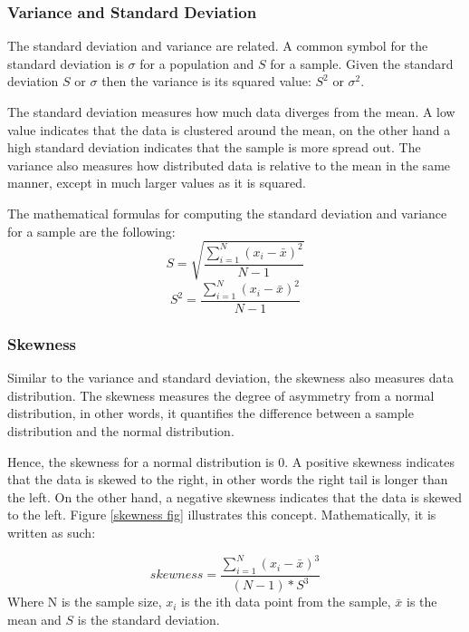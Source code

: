 \subsubsection{Variance and Standard Deviation}

The standard deviation and variance are related. A common symbol for the standard deviation is $\sigma$ for a population and $S$ for a sample. Given the standard deviation $S$ or $\sigma$ then the variance is its squared value: $S^{2}$ or $\sigma^{2}$.

The standard deviation measures how much data diverges from the mean. A low value indicates that the data is clustered around the mean, on the other hand a high standard deviation indicates that the sample is more spread out. The variance also measures how distributed data is relative to the mean in the same manner, except in much larger values as it is squared.

The mathematical formulas for computing the standard deviation and variance for a sample are the following:
\begin{equation}
    S = \sqrt{\frac{\sum_{i=1}^{N}(x_{i} - \bar{x})^{2}}{N - 1}}
\end{equation}
\begin{equation}
    S^2 = \frac{\sum_{i=1}^{N}(x_{i} - \bar{x})^{2}}{N - 1}
\end{equation}

\subsubsection{Skewness}

Similar to the variance and standard deviation, the skewness also measures data distribution. The skewness measures the degree of asymmetry from a normal distribution, in other words, it quantifies the difference between a sample distribution and the normal distribution.

Hence, the skewness for a normal distribution is 0. A positive skewness indicates that the data is skewed to the right, in other words the right tail is longer than the left. On the other hand, a negative skewness indicates that the data is skewed to the left. Figure \ref{skewness fig} illustrates this concept. Mathematically, it is written as such:

\begin{equation}
    skewness = \frac{\sum_{i=1}^{N}(x_{i} - \bar{x})^{3}}{(N - 1) * S^{3}}
\end{equation}
Where N is the sample size, $x_{i}$ is the ith data point from the sample, $\bar{x}$ is the mean and $S$ is the standard deviation.

